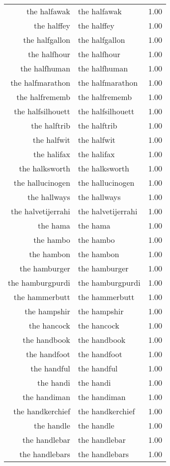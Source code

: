 \begin{table}[ht]
\begin{tabular}{rlr}
  the halfawak & the halfawak & 1.00 \\ 
  the halffey & the halffey & 1.00 \\ 
  the halfgallon & the halfgallon & 1.00 \\ 
  the halfhour & the halfhour & 1.00 \\ 
  the halfhuman & the halfhuman & 1.00 \\ 
  the halfmarathon & the halfmarathon & 1.00 \\ 
  the halfrememb & the halfrememb & 1.00 \\ 
  the halfsilhouett & the halfsilhouett & 1.00 \\ 
  the halftrib & the halftrib & 1.00 \\ 
  the halfwit & the halfwit & 1.00 \\ 
  the halifax & the halifax & 1.00 \\ 
  the halksworth & the halksworth & 1.00 \\ 
  the hallucinogen & the hallucinogen & 1.00 \\ 
  the hallways & the hallways & 1.00 \\ 
  the halvetijerrahi & the halvetijerrahi & 1.00 \\ 
  the hama & the hama & 1.00 \\ 
  the hambo & the hambo & 1.00 \\ 
  the hambon & the hambon & 1.00 \\ 
  the hamburger & the hamburger & 1.00 \\ 
  the hamburgpurdi & the hamburgpurdi & 1.00 \\ 
  the hammerbutt & the hammerbutt & 1.00 \\ 
  the hampshir & the hampshir & 1.00 \\ 
  the hancock & the hancock & 1.00 \\ 
  the handbook & the handbook & 1.00 \\ 
  the handfoot & the handfoot & 1.00 \\ 
  the handful & the handful & 1.00 \\ 
  the handi & the handi & 1.00 \\ 
  the handiman & the handiman & 1.00 \\ 
  the handkerchief & the handkerchief & 1.00 \\ 
  the handle & the handle & 1.00 \\ 
  the handlebar & the handlebar & 1.00 \\ 
  the handlebars & the handlebars & 1.00 \\ 

\end{tabular}
\end{table}
